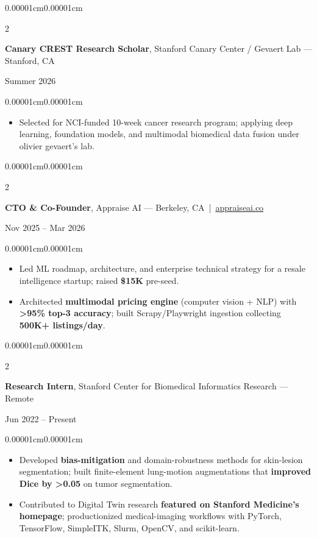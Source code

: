\documentclass[10pt, letterpaper]{article}
\newenvironment{highlights}{
  \begin{itemize}[topsep=0.04cm, parsep=0.02cm, partopsep=0pt, itemsep=0pt, leftmargin=10pt]
}{
  \end{itemize}
}
\newenvironment{onecolentry}{
  \begin{adjustwidth}{0.00001cm}{0.00001cm}
}{
  \end{adjustwidth}
}
\newenvironment{twocolentry}[2][]{
  \onecolentry
  \def\secondColumn{#2}
  \setcolumnwidth{\fill,4.5cm}
  \begin{paracol}{2}
}{
  \switchcolumn \raggedleft \secondColumn
  \end{paracol}
  \endonecolentry
}
\begin{document}
  \begin{twocolentry}{Summer 2026}
    \textbf{Canary CREST Research Scholar}, Stanford Canary Center / Gevaert Lab --- Stanford, CA
  \end{twocolentry}
  \begin{onecolentry}
    \begin{highlights}
      \item Selected for NCI-funded 10-week cancer research program; applying deep learning, foundation models, and multimodal biomedical data fusion under olivier gevaert's lab.
    \end{highlights}
  \end{onecolentry}

  \begin{twocolentry}{Nov 2025 -- Mar 2026}
    \textbf{CTO \& Co-Founder}, Appraise AI --- Berkeley, CA \,|\, 
    \href{https://appraiseai.co}{appraiseai.co}
  \end{twocolentry}
  \begin{onecolentry}
    \begin{highlights}
      \item Led ML roadmap, architecture, and enterprise technical strategy for a resale intelligence startup; raised \textbf{\$15K} pre-seed.
      \item Architected \textbf{multimodal pricing engine} (computer vision + NLP) with \textbf{>95\% top-3 accuracy}; built Scrapy/Playwright ingestion collecting \textbf{500K+ listings/day}.
    \end{highlights}
  \end{onecolentry}

  \begin{twocolentry}{Jun 2022 -- Present}
    \textbf{Research Intern}, Stanford Center for Biomedical Informatics Research --- Remote
  \end{twocolentry}
  \begin{onecolentry}
    \begin{highlights}
      \item Developed \textbf{bias-mitigation} and domain-robustness methods for skin-lesion segmentation; built finite-element lung-motion augmentations that \textbf{improved Dice by >0.05} on tumor segmentation.
      \item Contributed to Digital Twin research \textbf{featured on Stanford Medicine's homepage}; productionized medical-imaging workflows with PyTorch, TensorFlow, SimpleITK, Slurm, OpenCV, and scikit-learn.
    \end{highlights}
  \end{onecolentry}
\end{document}
